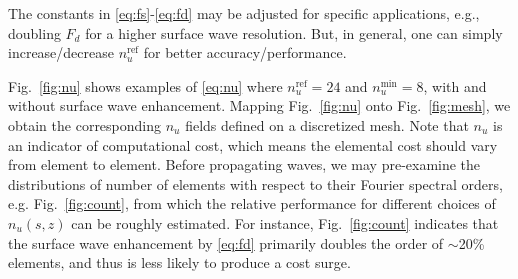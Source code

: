 \documentclass[extra]{gji}
\begin{document}
The constants in \eqref{eq:fs}-\eqref{eq:fd} may be adjusted 
for specific applications, e.g., doubling $F_d$ for a higher 
surface wave resolution. But, in general, one can simply
increase/decrease $n_u^\text{ref}$ for better accuracy/performance.

Fig.~\ref{fig:nu} shows examples of \eqref{eq:nu} where 
$n_u^\text{ref}=24$ and $n_u^\text{min}=8$, 
with and without surface wave enhancement. 
Mapping Fig.~\ref{fig:nu} onto Fig.~\ref{fig:mesh}, we obtain
the corresponding $n_u$ fields defined on a discretized mesh.
Note that $n_u$ is an indicator of computational cost,
which means the elemental cost should vary from element to element.
Before propagating waves, we may pre-examine the distributions of number of elements 
with respect to their Fourier spectral orders, e.g. Fig.~\ref{fig:count}, from which 
the relative performance for different choices of $n_u\left(s,z\right)$
 can be roughly estimated.
For instance, Fig.~\ref{fig:count} indicates that the surface wave 
enhancement by \eqref{eq:fd} primarily doubles the order of  
$\sim$20\% elements, and thus is less likely to produce a cost surge.
\end{document}
